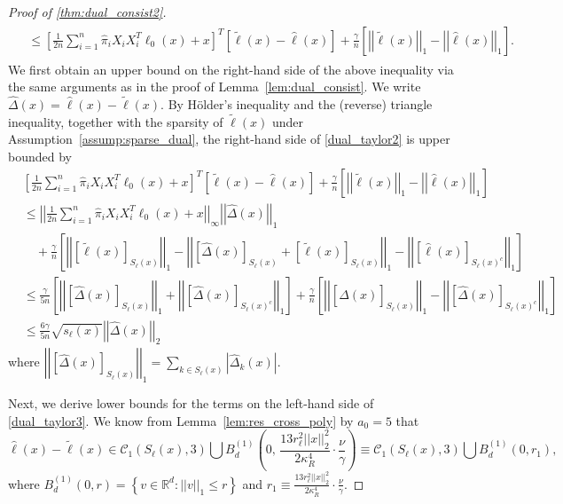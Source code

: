 \documentclass[10pt,a4paper]{amsart}
\theoremstyle{plain}
\theoremstyle{remark}
\renewcommand{\hat}{\widehat}
\renewcommand{\tilde}{\widetilde}
\newcommand{\norm}[1]{\left|\left| #1 \right|\right|}
\begin{document}
\begin{proof}[Proof of \autoref{thm:dual_consist2}]
{\begin{align}
\begin{split}
			&\leq \left[\frac{1}{2n} \sum_{i=1}^n \hat{\pi}_i X_iX_i^T \ell_0(x) +x \right]^T \left[\tilde{\ell}(x) - \hat{\ell}(x) \right] + \frac{\gamma}{n}\left[\norm{\tilde{\ell}(x)}_1 - \norm{\hat{\ell}(x)}_1 \right].
		\end{split}
	\end{align}}%
	We first obtain an upper bound on the right-hand side of the above inequality via the same arguments as in the proof of Lemma~\ref{lem:dual_consist}. We write $\hat{\Delta}(x) = \hat{\ell}(x) - \tilde{\ell}(x)$. By H{\"o}lder's inequality and the (reverse) triangle inequality, together with the sparsity of $\tilde{\ell}(x)$ under Assumption~\ref{assump:sparse_dual}, the right-hand side of \eqref{dual_taylor2} is upper bounded by
	\begin{align*}
		&\left[\frac{1}{2n} \sum_{i=1}^n \hat{\pi}_i X_iX_i^T \ell_0(x) +x \right]^T \left[\tilde{\ell}(x) - \hat{\ell}(x) \right] + \frac{\gamma}{n}\left[\norm{\tilde{\ell}(x)}_1 - \norm{\hat{\ell}(x)}_1 \right] \\
		&\leq \norm{\frac{1}{2n} \sum_{i=1}^n \hat{\pi}_i X_iX_i^T \ell_0(x) +x}_{\infty} \norm{\hat{\Delta}(x)}_1 \\
		&\quad + \frac{\gamma}{n} \left[\norm{\left[\tilde{\ell}(x)\right]_{S_{\ell}(x)}}_1 - \norm{\left[\hat{\Delta}(x)\right]_{S_{\ell}(x)} + \left[\tilde{\ell}(x)\right]_{S_{\ell}(x)}}_1 - \norm{\left[\hat{\ell}(x)\right]_{S_{\ell}(x)^c}}_1\right]\\
		&\leq \frac{\gamma}{5n} \left[\norm{\left[\hat{\Delta}(x)\right]_{S_{\ell}(x)}}_1 + \norm{\left[\hat{\Delta}(x)\right]_{S_{\ell}(x)^c}}_1 \right] + \frac{\gamma}{n} \left[\norm{\left[\hat{\Delta}(x) \right]_{S_{\ell}(x)}}_1 - \norm{\left[\hat{\Delta}(x) \right]_{S_{\ell}(x)^c}}_1 \right]\\
		&\leq \frac{6\gamma}{5n} \sqrt{s_{\ell}(x)} \norm{\hat{\Delta}(x)}_2
	\end{align*}
	where $\norm{\left[\hat{\Delta}(x) \right]_{S_{\ell}(x)}}_1 = \sum_{k\in S_{\ell}(x)} \left|\hat{\Delta}_k(x) \right|$.
	
	Next, we derive lower bounds for the terms on the left-hand side of \eqref{dual_taylor3}. We know from Lemma~\ref{lem:res_cross_poly} by $a_0=5$ that 
	$$\hat{\ell}(x)-\tilde{\ell}(x) \in \mathcal{C}_1\left(S_{\ell}(x), 3 \right) \bigcup B_d^{(1)}\left(0,\, \frac{13 r_{\ell}^2 \norm{x}_2^2}{2 \kappa_R^4} \cdot \frac{\nu}{\gamma}\right) \equiv \mathcal{C}_1\left(S_{\ell}(x), 3 \right) \bigcup B_d^{(1)}(0,r_1),$$ 
	where $B_d^{(1)}(0,r) = \left\{v\in \mathbb{R}^d: \norm{v}_1 \leq r\right\}$ and $r_1 \equiv \frac{13 r_{\ell}^2 \norm{x}_2^2}{2 \kappa_R^4} \cdot \frac{\nu}{\gamma}$.
	

\end{proof}
\end{document}
